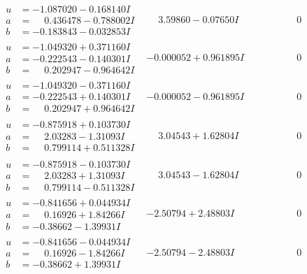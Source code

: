 \documentclass[1p]{elsarticle_modified}
\theoremstyle{definition}
\begin{document}
$$\begin{array}{c|c|c}
\begin{aligned}
u &= -1.087020 - 0.168140 I \\
a &= \phantom{-}0.436478 - 0.788002 I \\
b &= -0.183843 - 0.032853 I\end{aligned}
 & \phantom{-}3.59860 - 0.07650 I & \phantom{-0.000000 } 0 \\ \hline\begin{aligned}
u &= -1.049320 + 0.371160 I \\
a &= -0.222543 - 0.140301 I \\
b &= \phantom{-}0.202947 - 0.964642 I\end{aligned}
 & -0.000052 + 0.961895 I & \phantom{-0.000000 } 0 \\ \hline\begin{aligned}
u &= -1.049320 - 0.371160 I \\
a &= -0.222543 + 0.140301 I \\
b &= \phantom{-}0.202947 + 0.964642 I\end{aligned}
 & -0.000052 - 0.961895 I & \phantom{-0.000000 } 0 \\ \hline\begin{aligned}
u &= -0.875918 + 0.103730 I \\
a &= \phantom{-}2.03283 - 1.31093 I \\
b &= \phantom{-}0.799114 + 0.511328 I\end{aligned}
 & \phantom{-}3.04543 + 1.62804 I & \phantom{-0.000000 } 0 \\ \hline\begin{aligned}
u &= -0.875918 - 0.103730 I \\
a &= \phantom{-}2.03283 + 1.31093 I \\
b &= \phantom{-}0.799114 - 0.511328 I\end{aligned}
 & \phantom{-}3.04543 - 1.62804 I & \phantom{-0.000000 } 0 \\ \hline\begin{aligned}
u &= -0.841656 + 0.044934 I \\
a &= \phantom{-}0.16926 + 1.84266 I \\
b &= -0.38662 - 1.39931 I\end{aligned}
 & -2.50794 + 2.48803 I & \phantom{-0.000000 } 0 \\ \hline\begin{aligned}
u &= -0.841656 - 0.044934 I \\
a &= \phantom{-}0.16926 - 1.84266 I \\
b &= -0.38662 + 1.39931 I\end{aligned}
 & -2.50794 - 2.48803 I & \phantom{-0.000000 } 0\\

\end{array}$$
\end{document}
